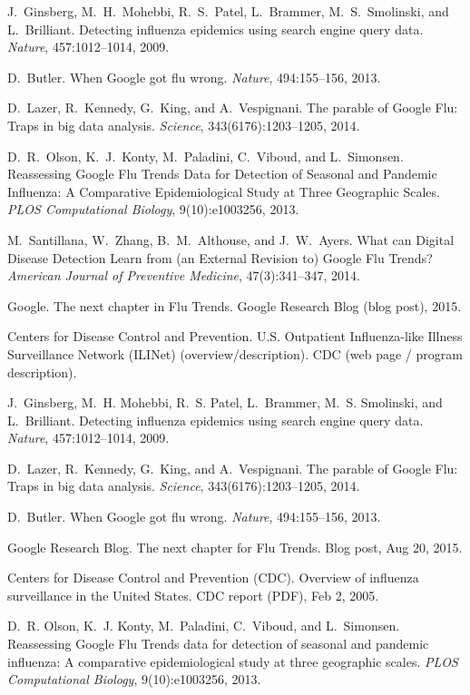 J.~Ginsberg, M.~H.~Mohebbi, R.~S.~Patel, L.~Brammer, M.~S.~Smolinski, and L.~Brilliant.
\newblock Detecting influenza epidemics using search engine query data.
\newblock \emph{Nature}, 457:1012--1014, 2009.

D.~Butler.
\newblock When Google got flu wrong.
\newblock \emph{Nature}, 494:155--156, 2013.

D.~Lazer, R.~Kennedy, G.~King, and A.~Vespignani.
\newblock The parable of Google Flu: Traps in big data analysis.
\newblock \emph{Science}, 343(6176):1203--1205, 2014.

D.~R.~Olson, K.~J.~Konty, M.~Paladini, C.~Viboud, and L.~Simonsen.
\newblock Reassessing Google Flu Trends Data for Detection of Seasonal and Pandemic Influenza: A Comparative Epidemiological Study at Three Geographic Scales.
\newblock \emph{PLOS Computational Biology}, 9(10):e1003256, 2013.

M.~Santillana, W.~Zhang, B.~M.~Althouse, and J.~W.~Ayers.
\newblock What can Digital Disease Detection Learn from (an External Revision to) Google Flu Trends?
\newblock \emph{American Journal of Preventive Medicine}, 47(3):341--347, 2014.

Google.
\newblock The next chapter in Flu Trends.
\newblock Google Research Blog (blog post), 2015.

Centers for Disease Control and Prevention.
\newblock U.S. Outpatient Influenza-like Illness Surveillance Network (ILINet) (overview/description).
\newblock CDC (web page / program description).

J.~Ginsberg, M.~H. Mohebbi, R.~S. Patel, L.~Brammer, M.~S. Smolinski, and L.~Brilliant.
\newblock Detecting influenza epidemics using search engine query data.
\newblock \emph{Nature}, 457:1012--1014, 2009.

D.~Lazer, R.~Kennedy, G.~King, and A.~Vespignani.
\newblock The parable of Google Flu: Traps in big data analysis.
\newblock \emph{Science}, 343(6176):1203--1205, 2014.

D.~Butler.
\newblock When Google got flu wrong.
\newblock \emph{Nature}, 494:155--156, 2013.

Google Research Blog.
\newblock The next chapter for Flu Trends.
\newblock Blog post, Aug 20, 2015.

Centers for Disease Control and Prevention (CDC).
\newblock Overview of influenza surveillance in the United States.
\newblock CDC report (PDF), Feb 2, 2005.

D.~R. Olson, K.~J. Konty, M.~Paladini, C.~Viboud, and L.~Simonsen.
\newblock Reassessing Google Flu Trends data for detection of seasonal and pandemic influenza: A comparative epidemiological study at three geographic scales.
\newblock \emph{PLOS Computational Biology}, 9(10):e1003256, 2013.
